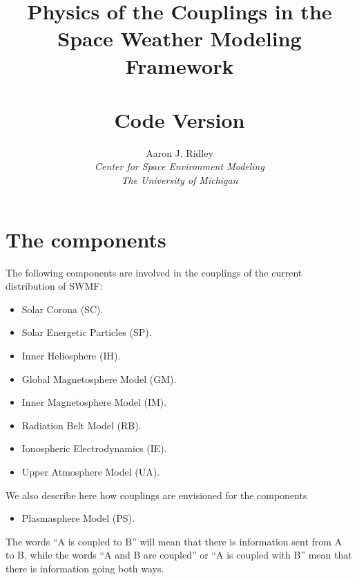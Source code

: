 \documentclass[twoside,10pt]{article}
\title{Physics of the Couplings in the Space Weather Modeling Framework\\
  \hfill \\
  \large Code Version \SWMFVERSION}
\author{Aaron J. Ridley\\
  {\it Center for Space Environment Modeling}\\
  {\it The University of Michigan}}
\begin{document}
\pagestyle{fancy}
\lhead[\fancyplain{}{\bfseries\thepage}]{\fancyplain{}{\bfseries\rightmark}}
\rhead[\fancyplain{}{\bfseries\leftmark}]{\fancyplain{}{\bfseries\thepage}}
\cfoot{}

\maketitle

\newpage

\tableofcontents

\newpage

\section{The components}

The following components are involved in the couplings
of the current distribution of SWMF:
\begin{itemize}

\item Solar Corona (SC).

\item Solar Energetic Particles (SP).

\item Inner Heliosphere (IH).

\item Global Magnetosphere Model (GM).

\item Inner Magnetosphere Model (IM).

\item Radiation Belt Model (RB).

\item Ionospheric Electrodynamics (IE).

\item Upper Atmosphere Model (UA).

\end{itemize}
We also describe here how couplings are envisioned for
the components
\begin{itemize}

\item Plasmasphere Model (PS).

\end{itemize}
The words ``A is coupled to B'' will mean that there is
information sent from A to B, while the words ``A and B are
coupled'' or ``A is coupled with B'' mean 
that there is information going both ways.
\end{document}

